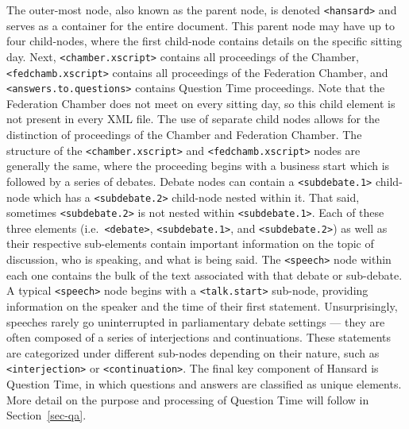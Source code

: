 \documentclass[
  letterpaper,
  DIV=11,
  numbers=noendperiod]{scrartcl}
\begin{document}
The outer-most node, also known as the parent node, is denoted
\texttt{\textless{}hansard\textgreater{}} and serves as a container for
the entire document. This parent node may have up to four child-nodes,
where the first child-node contains details on the specific sitting day.
Next, \texttt{\textless{}chamber.xscript\textgreater{}} contains all
proceedings of the Chamber,
\texttt{\textless{}fedchamb.xscript\textgreater{}} contains all
proceedings of the Federation Chamber, and
\texttt{\textless{}answers.to.questions\textgreater{}} contains Question
Time proceedings. Note that the Federation Chamber does not meet on
every sitting day, so this child element is not present in every XML
file. The use of separate child nodes allows for the distinction of
proceedings of the Chamber and Federation Chamber. The structure of the
\texttt{\textless{}chamber.xscript\textgreater{}} and
\texttt{\textless{}fedchamb.xscript\textgreater{}} nodes are generally
the same, where the proceeding begins with a business start which is
followed by a series of debates. Debate nodes can contain a
\texttt{\textless{}subdebate.1\textgreater{}} child-node which has a
\texttt{\textless{}subdebate.2\textgreater{}} child-node nested within
it. That said, sometimes \texttt{\textless{}subdebate.2\textgreater{}}
is not nested within \texttt{\textless{}subdebate.1\textgreater{}}. Each
of these three elements (i.e.~\texttt{\textless{}debate\textgreater{}},
\texttt{\textless{}subdebate.1\textgreater{}}, and
\texttt{\textless{}subdebate.2\textgreater{}}) as well as their
respective sub-elements contain important information on the topic of
discussion, who is speaking, and what is being said. The
\texttt{\textless{}speech\textgreater{}} node within each one contains
the bulk of the text associated with that debate or sub-debate. A
typical \texttt{\textless{}speech\textgreater{}} node begins with a
\texttt{\textless{}talk.start\textgreater{}} sub-node, providing
information on the speaker and the time of their first statement.
Unsurprisingly, speeches rarely go uninterrupted in parliamentary debate
settings --- they are often composed of a series of interjections and
continuations. These statements are categorized under different
sub-nodes depending on their nature, such as
\texttt{\textless{}interjection\textgreater{}} or
\texttt{\textless{}continuation\textgreater{}}. The final key component
of Hansard is Question Time, in which questions and answers are
classified as unique elements. More detail on the purpose and processing
of Question Time will follow in Section~\ref{sec-qa}.
\end{document}

